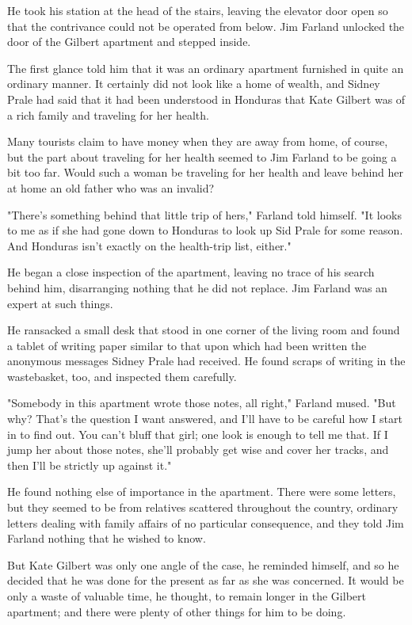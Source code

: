 \documentclass{novel}
\begin{document}
He took his station at the head of the stairs, leaving the elevator door open so that the contrivance could not be operated from below. Jim Farland unlocked the door of the Gilbert apartment and stepped inside.

The first glance told him that it was an ordinary apartment furnished in quite an ordinary manner. It certainly did not look like a home of wealth, and Sidney Prale had said that it had been understood in Honduras that Kate Gilbert was of a rich family and traveling for her health.

Many tourists claim to have money when they are away from home, of course, but the part about traveling for her health seemed to Jim Farland to be going a bit too far. Would such a woman be traveling for her health and leave behind her at home an old father who was an invalid?

"There's something behind that little trip of hers," Farland told himself. "It looks to me as if she had gone down to Honduras to look up Sid Prale for some reason. And Honduras isn't exactly on the health-trip list, either."

He began a close inspection of the apartment, leaving no trace of his search behind him, disarranging nothing that he did not replace. Jim Farland was an expert at such things.

He ransacked a small desk that stood in one corner of the living room and found a tablet of writing paper similar to that upon which had been written the anonymous messages Sidney Prale had received. He found scraps of writing in the wastebasket, too, and inspected them carefully.

"Somebody in this apartment wrote those notes, all right," Farland mused. "But why? That's the question I want answered, and I'll have to be careful how I start in to find out. You can't bluff that girl; one look is enough to tell me that. If I jump her about those notes, she'll probably get wise and cover her tracks, and then I'll be strictly up against it."

He found nothing else of importance in the apartment. There were some letters, but they seemed to be from relatives scattered throughout the country, ordinary letters dealing with family affairs of no particular consequence, and they told Jim Farland nothing that he wished to know.

But Kate Gilbert was only one angle of the case, he reminded himself, and so he decided that he was done for the present as far as she was concerned. It would be only a waste of valuable time, he thought, to remain longer in the Gilbert apartment; and there were plenty of other things for him to be doing.
\end{document}
